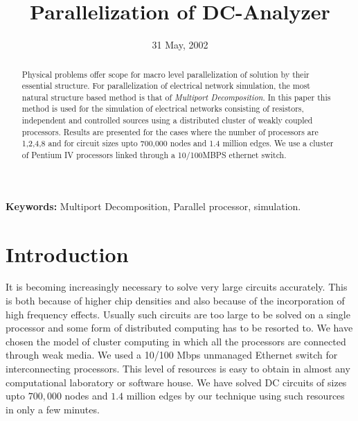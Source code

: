 \documentclass[12pt,psfig,a4]{article}
\begin{document}
 
\pagestyle{plain} 

\title{Parallelization of DC-Analyzer}
\author{
}
\date{31 May, 2002}
\maketitle


\begin{abstract} 

Physical problems offer scope for macro level parallelization of solution by their essential structure. For parallelization of
electrical network simulation, the most natural structure based method is that of {\it Multiport Decomposition}. In this paper
this method is used for the simulation of electrical networks consisting of resistors, independent and controlled sources using 
a distributed cluster of weakly coupled processors. 
Results are presented for the cases where the number of processors
are 1,2,4,8 and for circuit sizes upto 700,000 nodes and
1.4 million edges. We use a cluster of Pentium IV processors linked 
through a 10/100MBPS ethernet switch.



\end{abstract} 

{\bf Keywords:} Multiport Decomposition, Parallel processor, simulation.\\

\section{Introduction}

It is becoming increasingly necessary to solve very large circuits
accurately. This is both because of higher chip densities and also
because of
the incorporation of high frequency effects.
Usually such circuits are too large to be solved on a single
processor and some form of distributed computing has to be resorted to.
We have chosen the model of cluster computing in which all the processors are connected 
through  weak media. 
We used a 10/100 Mbps unmanaged Ethernet switch for interconnecting processors. 
This level of resources is easy to obtain in almost any computational
laboratory or software house. We have solved DC circuits of sizes
upto $700,000$ nodes and $1.4$ million edges by our technique 
using such resources in only a few minutes.
\par
\end{document}
